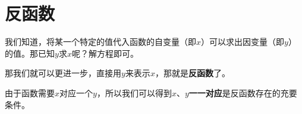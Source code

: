 \section{反函数}
我们知道，将某一个特定的值代入函数的自变量（即$x$）可以求出因变量（即$y$）的值。那已知$y$求$x$呢？解方程即可。

那我们就可以更进一步，直接用$y$来表示$x$，那就是\textbf{反函数}了。

由于函数需要$x$对应一个$y$，所以我们可以得到$x$、$y$\textbf{一一对应}是反函数存在的充要条件。
